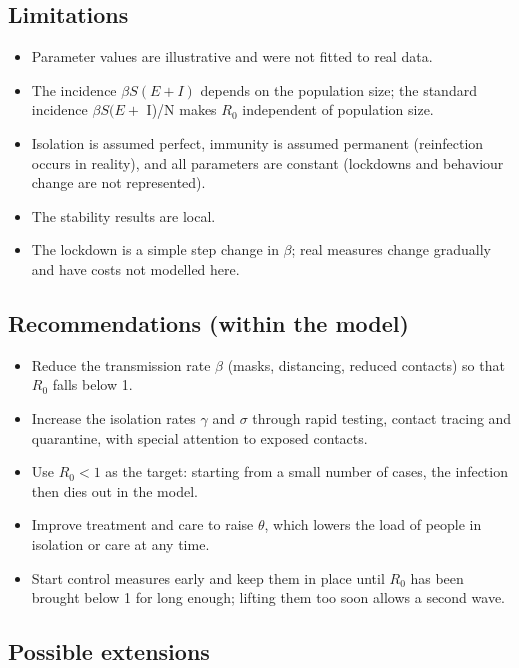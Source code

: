 \documentclass[12pt,a4paper]{article}
\theoremstyle{definition}
\begin{document}
\subsection{Limitations}

\begin{itemize}
\item Parameter values are illustrative and were not fitted to real data.
\item The incidence $\beta S(E + I)$ depends on the population size; the standard incidence $\beta S(E +$ I)/N makes $R_{0}$ independent of population size.
\item Isolation is assumed perfect, immunity is assumed permanent (reinfection occurs in reality), and all parameters are constant (lockdowns and behaviour change are not represented).
\item The stability results are local.
\item The lockdown is a simple step change in $\beta$; real measures change gradually and have costs not modelled here.
\end{itemize}

\subsection{Recommendations (within the model)}

\begin{itemize}
\item Reduce the transmission rate $\beta$ (masks, distancing, reduced contacts) so that $R_{0}$ falls below 1.
\item Increase the isolation rates $\gamma$ and $\sigma$ through rapid testing, contact tracing and quarantine, with special attention to exposed contacts.
\item Use $R_{0} < 1$ as the target: starting from a small number of cases, the infection then dies out in the model.
\item Improve treatment and care to raise $\theta$, which lowers the load of people in isolation or care at any time.
\item Start control measures early and keep them in place until $R_{0}$ has been brought below 1 for long enough; lifting them too soon allows a second wave.
\end{itemize}

\subsection{Possible extensions}
\end{document}
